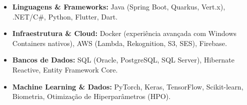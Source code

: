 \begin{itemize}[leftmargin=*, noitemsep]
    \item \textbf{Linguagens \& Frameworks:} Java (Spring Boot, Quarkus, Vert.x), .NET/C\#, Python, Flutter, Dart. %
    \item \textbf{Infraestrutura \& Cloud:} Docker (experiência avançada com Windows Containers nativos), AWS (Lambda, Rekognition, S3, SES), Firebase. %
    \item \textbf{Bancos de Dados:} SQL (Oracle, PostgreSQL, SQL Server), Hibernate Reactive, Entity Framework Core. %
    \item \textbf{Machine Learning \& Dados:} PyTorch, Keras, TensorFlow, Scikit-learn, Biometria, Otimização de Hiperparâmetros (HPO). %
\end{itemize}
